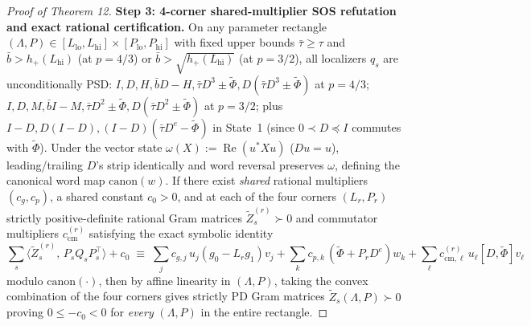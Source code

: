 \documentclass[10pt,letterpaper]{article}
\begin{document}
\begin{proof}[Proof of Theorem 12]
\textbf{Step 3: 4-corner shared-multiplier SOS refutation and exact rational certification.}
On any parameter rectangle $(\Lambda, P) \in [L_{\mathrm{lo}}, L_{\mathrm{hi}}] \times [P_{\mathrm{lo}}, P_{\mathrm{hi}}]$ with fixed upper bounds $\bar{\tau} \ge \tau$ and $\bar{b} > h_+(L_{\mathrm{hi}})$ (at $p = 4/3$) or $\bar{b} > \sqrt{h_+(L_{\mathrm{hi}})}$ (at $p = 3/2$), all localizers $q_s$ are unconditionally PSD: $I, D, H, \bar{b}D-H, \bar{\tau}D^3 \pm \widetilde{\Phi}, D(\bar{\tau}D^3 \pm \widetilde{\Phi})$ at $p = 4/3$; $I, D, M, \bar{b}I-M, \bar{\tau}D^2 \pm \widetilde{\Phi}, D(\bar{\tau}D^2 \pm \widetilde{\Phi})$ at $p = 3/2$; plus $I-D, D(I-D), (I-D)(\bar{\tau}D^e - \widetilde{\Phi})$ in State~1 (since $0 \prec D \preceq I$ commutes with $\widetilde{\Phi}$). Under the vector state $\omega(X) := \operatorname{Re}(u^* X u)$ ($Du = u$), leading/trailing $D$'s strip identically and word reversal preserves $\omega$, defining the canonical word map $\mathrm{canon}(w)$. If there exist \emph{shared} rational multipliers $(c_g, c_p)$, a shared constant $c_0 > 0$, and at each of the four corners $(L_r, P_r)$ strictly positive-definite rational Gram matrices $\widetilde{Z}_s^{(r)} \succ 0$ and commutator multipliers $c_{\mathrm{cm}}^{(r)}$ satisfying the exact symbolic identity
\[
  \sum_s \langle \widetilde{Z}_s^{(r)},\, P_s Q_s P_s^\top \rangle + c_0
  \;\equiv\;
  \sum_j c_{g,j}\, u_j (g_0 - L_r g_1) v_j
  + \sum_k c_{p,k}\, (\widetilde{\Phi} + P_r D^e) w_k
  + \sum_\ell c_{\mathrm{cm},\ell}^{(r)}\, u_\ell [D, \widetilde{\Phi}] v_\ell
\]
modulo $\mathrm{canon}(\cdot)$, then by affine linearity in $(\Lambda, P)$, taking the convex combination of the four corners gives strictly PD Gram matrices $\widetilde{Z}_s(\Lambda, P) \succ 0$ proving $0 \le -c_0 < 0$ for \emph{every} $(\Lambda, P)$ in the entire rectangle.


\end{proof}
\end{document}
